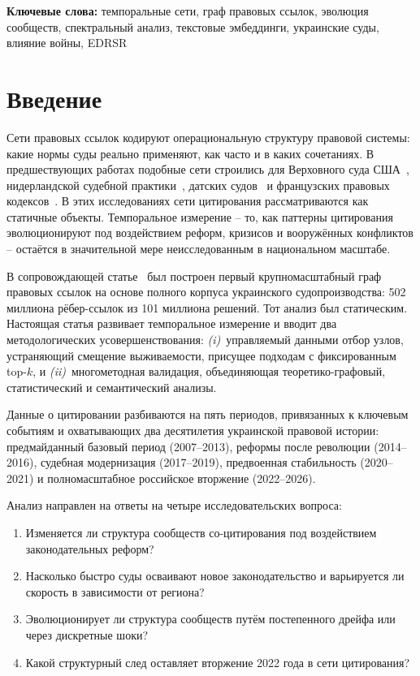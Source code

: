 \documentclass[11pt]{article}
\begin{document}
\medskip
\noindent\textbf{Ключевые слова:} темпоральные сети, граф правовых ссылок, эволюция сообществ, спектральный анализ, текстовые эмбеддинги, украинские суды, влияние войны, EDRSR

\section{Введение}
\label{sec:intro}

Сети правовых ссылок кодируют операциональную структуру правовой системы: какие нормы суды реально применяют, как часто и в каких сочетаниях.
В предшествующих работах подобные сети строились для Верховного суда США~\citep{fowler2007network}, нидерландской судебной практики~\citep{winkels2011determining}, датских судов~\citep{mones2021emergence} и французских правовых кодексов~\citep{mazzega2009network}.
В этих исследованиях сети цитирования рассматриваются как статичные объекты.
Темпоральное измерение -- то, как паттерны цитирования эволюционируют под воздействием реформ, кризисов и вооружённых конфликтов -- остаётся в значительной мере неисследованным в национальном масштабе.

В сопровождающей статье~\citep{ovcharov2026citationgraph} был построен первый крупномасштабный граф правовых ссылок на основе полного корпуса украинского судопроизводства: 502 миллиона рёбер-ссылок из 101 миллиона решений.
Тот анализ был статическим.
Настоящая статья развивает темпоральное измерение и вводит два методологических усовершенствования: \emph{(i)}~управляемый данными отбор узлов, устраняющий смещение выживаемости, присущее подходам с фиксированным top-$k$, и \emph{(ii)}~многометодная валидация, объединяющая теоретико-графовый, статистический и семантический анализы.

Данные о цитировании разбиваются на пять периодов, привязанных к ключевым событиям и охватывающих два десятилетия украинской правовой истории: предмайданный базовый период (2007--2013), реформы после революции (2014--2016), судебная модернизация (2017--2019), предвоенная стабильность (2020--2021) и полномасштабное российское вторжение (2022--2026).

Анализ направлен на ответы на четыре исследовательских вопроса:
\begin{enumerate}[nosep]
  \item[\textbf{RQ1}:] Изменяется ли структура сообществ со-цитирования под воздействием законодательных реформ?
  \item[\textbf{RQ2}:] Насколько быстро суды осваивают новое законодательство и варьируется ли скорость в зависимости от региона?
  \item[\textbf{RQ3}:] Эволюционирует ли структура сообществ путём постепенного дрейфа или через дискретные шоки?
  \item[\textbf{RQ4}:] Какой структурный след оставляет вторжение 2022 года в сети цитирования?
\end{enumerate}
\end{document}
